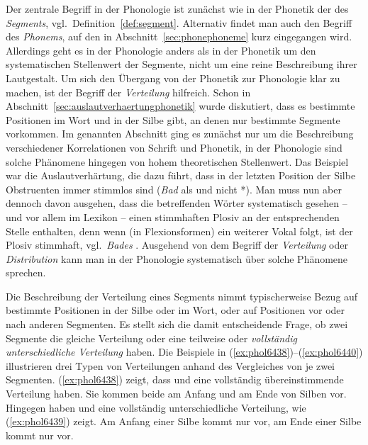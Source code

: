 Der zentrale Begriff in der Phonologie ist zunächst wie in der Phonetik der des \textit{Segments}, vgl.\ Definition~\ref{def:segment}.
Alternativ findet man auch den Begriff des \textit{Phonems}, auf den in Abschnitt~\ref{sec:phonephoneme} kurz eingegangen wird.
Allerdings geht es in der Phonologie anders als in der Phonetik um den systematischen Stellenwert der Segmente, nicht um eine reine Beschreibung ihrer Lautgestalt.
Um sich den Übergang von der Phonetik zur Phonologie klar zu machen, ist der Begriff der \textit{Verteilung} hilfreich.
Schon in Abschnitt~\ref{sec:auslautverhaertungphonetik} wurde diskutiert, dass es bestimmte Positionen im Wort und in der Silbe gibt, an denen nur bestimmte Segmente vorkommen.
Im genannten Abschnitt ging es zunächst nur um die Beschreibung verschiedener Korrelationen von Schrift und Phonetik, in der Phonologie sind solche Phänomene hingegen von hohem theoretischen Stellenwert.
Das Beispiel war die Auslautverhärtung, die dazu führt, dass in der letzten Position der Silbe Obstruenten immer stimmlos sind (\textit{Bad} als \textipa{[ba:t]} und nicht *\textipa{[ba:d]}).
Man muss nun aber dennoch davon ausgehen, dass die betreffenden Wörter systematisch gesehen -- und vor allem im Lexikon -- einen stimmhaften Plosiv an der entsprechenden Stelle enthalten, denn wenn (\zB in Flexionsformen) ein weiterer Vokal folgt, ist der Plosiv stimmhaft, vgl.\ \textit{Bades} .
Ausgehend von dem Begriff der \textit{Verteilung} oder \textit{Distribution} kann man in der Phonologie systematisch über solche Phänomene sprechen.


Die Beschreibung der Verteilung eines Segments nimmt typischerweise Bezug auf bestimmte Positionen in der Silbe oder im Wort, oder auf Positionen vor oder nach anderen Segmenten.
Es stellt sich die damit entscheidende Frage, ob zwei Segmente die gleiche Verteilung oder eine teilweise oder \textit{vollständig unterschiedliche Verteilung} haben.
Die Beispiele in (\ref{ex:phol6438})--(\ref{ex:phol6440}) illustrieren drei Typen von Verteilungen anhand des Vergleiches von je zwei Segmenten.
(\ref{ex:phol6438}) zeigt, dass \textipa{[t]} und \textipa{[k]} eine vollständig übereinstimmende Verteilung haben.
Sie kommen beide am Anfang und am Ende von Silben vor.
Hingegen haben \textipa{[h]} und \textipa{[N]} eine vollständig unterschiedliche  Verteilung, wie (\ref{ex:phol6439}) zeigt.
Am Anfang einer Silbe kommt nur \textipa{[h]} vor, am Ende einer Silbe kommt nur \textipa{[N]} vor.

